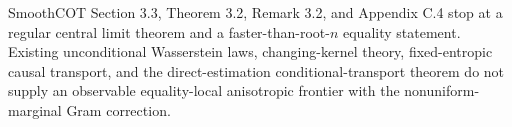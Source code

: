 SmoothCOT Section 3.3, Theorem 3.2, Remark 3.2, and Appendix C.4 stop at a regular central limit theorem and a faster-than-root-\(n\) equality statement.  Existing unconditional Wasserstein laws, changing-kernel theory, fixed-entropic causal transport, and the direct-estimation conditional-transport theorem do not supply an observable equality-local anisotropic frontier with the nonuniform-marginal Gram correction.